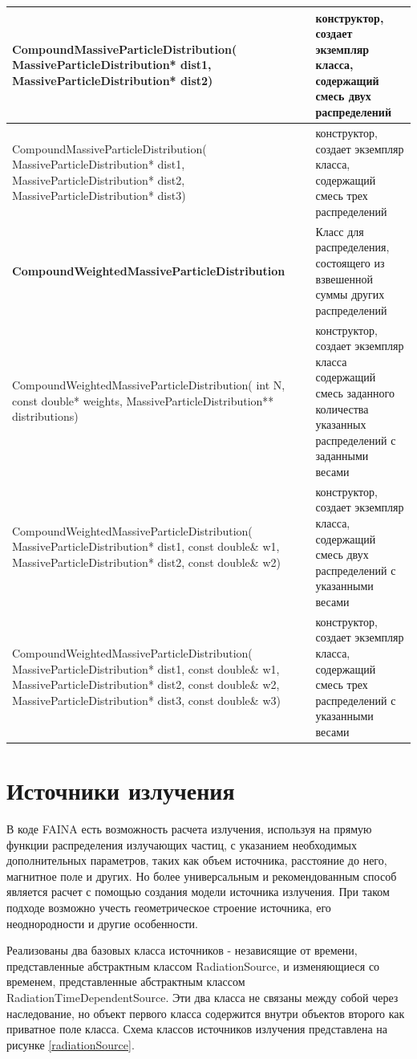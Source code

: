 \begin{small}
\begin{xtabular}{|p{0.52\textwidth}|p{0.48\textwidth}|}
		CompoundMassiveParticleDistribution( MassiveParticleDistribution* dist1, MassiveParticleDistribution* dist2) & конструктор, создает экземпляр класса, содержащий смесь двух распределений \\
		\hline
		CompoundMassiveParticleDistribution( MassiveParticleDistribution* dist1, MassiveParticleDistribution* dist2, MassiveParticleDistribution* dist3) & конструктор, создает экземпляр класса, содержащий смесь трех распределений\\
		\hline
		\textbf{CompoundWeightedMassiveParticleDistribution} & Класс для распределения, состоящего из взвешенной суммы других распределений \\
		\hline
		CompoundWeightedMassiveParticleDistribution( int N, const double* weights, MassiveParticleDistribution** distributions) & конструктор, создает экземпляр класса содержащий смесь заданного количества указанных распределений с заданными весами \\
		\hline
		CompoundWeightedMassiveParticleDistribution( MassiveParticleDistribution* dist1, const double\& w1, MassiveParticleDistribution* dist2, const double\& w2) & конструктор, создает экземпляр класса, содержащий смесь двух распределений с указанными весами \\
		\hline
		CompoundWeightedMassiveParticleDistribution( MassiveParticleDistribution* dist1, const double\& w1, MassiveParticleDistribution* dist2, const double\& w2, MassiveParticleDistribution* dist3, const double\& w3) & конструктор, создает экземпляр класса, содержащий смесь трех распределений с указанными весами \\
		\hline
				
	\end{xtabular}
\end{small}

\section{Источники излучения}

В коде FAINA есть возможность расчета излучения, используя на прямую функции распределения излучающих частиц, с указанием необходимых дополнительных параметров, таких как объем источника, расстояние до него, магнитное поле и других. Но более универсальным и рекомендованным способ является расчет с помощью создания модели источника излучения. При таком подходе возможно учесть геометрическое строение источника, его неоднородности и другие особенности.

Реализованы два базовых класса источников - независящие от времени, представленные абстрактным классом RadiationSource, и изменяющиеся со временем, представленные абстрактным классом RadiationTimeDependentSource. Эти два класса не связаны между собой через наследование, но объект первого класса содержится внутри объектов второго как приватное поле класса. Схема классов источников излучения представлена на рисунке \ref{radiationSource}.

